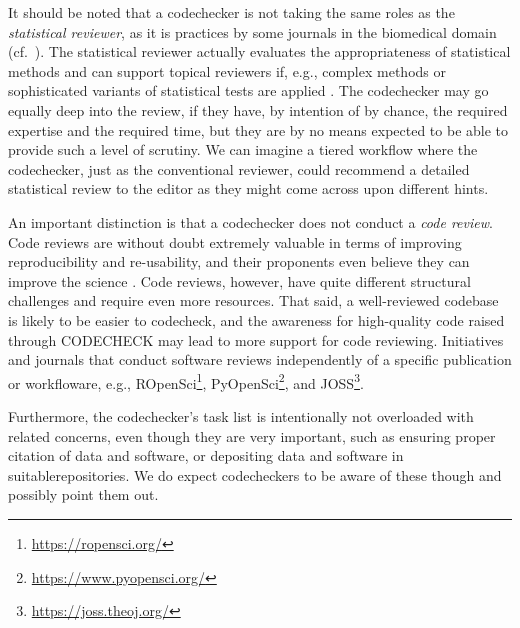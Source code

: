 \documentclass[12pt]{article}
\begin{document}
It should be noted that a codechecker is not taking the same roles as the
\emph{statistical reviewer}, as it is practices by some journals in the 
biomedical domain (cf.~\cite{petrovecki_role_2009,greenwood_how_2015}).
The statistical reviewer actually evaluates the appropriateness of
statistical methods \cite{greenwood_how_2015} and can support topical
reviewers if, e.g., complex methods or sophisticated variants of statistical
tests are applied \cite{petrovecki_role_2009}.
The codechecker may go equally deep into the review, if they have, by 
intention of by chance, the required expertise and the required time, 
but they are by no means expected to be able to provide
such a level of scrutiny. We can imagine a tiered workflow where the 
codechecker, just as the conventional reviewer, could recommend a detailed
statistical review to the editor as they might come across upon different
hints.

An important distinction is that a codechecker does not conduct a 
\emph{code review}. Code reviews are without doubt extremely valuable in 
terms of improving reproducibility and re-usability, and their proponents 
even believe they can improve the science \cite{petre_code_2014}.
Code reviews, however, have quite different structural challenges and 
require even more resources. That said, a well-reviewed codebase is likely
to be easier to codecheck, and the awareness for high-quality code raised
through CODECHECK may lead to more support for code reviewing.
Initiatives and journals that conduct software reviews independently of 
a specific publication or workfloware, e.g.,
ROpenSci\footnote{\url{https://ropensci.org/}},
PyOpenSci\footnote{\url{https://www.pyopensci.org/}},
and JOSS\footnote{\url{https://joss.theoj.org/}}.

Furthermore, the codechecker's task list is intentionally not overloaded
with related concerns, even though they are very important, such as ensuring
proper citation of data and software, or depositing data and software in 
suitablerepositories.
We do expect codecheckers to be aware of these though and possibly point 
them out.
\end{document}
